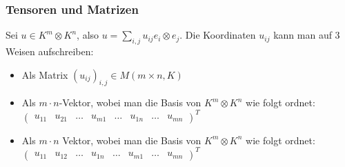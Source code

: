 \documentclass[9pt, a4paper, twocolumn, landscape]{article}
\newcommand{\comment}[1]{}
\begin{document}
\subsubsection{Tensoren und Matrizen}
\begin{remark}
Sei $u \in K^m \otimes K^n$, also $u = \sum\limits_{i, j} u_{ij} e_i \otimes e_j$.
Die Koordinaten $u_{ij}$ kann man auf 3 Weisen aufschreiben:
\begin{itemize}
\item Als Matrix $(u_{ij})_{i,j} \in M(m \times n, K)$
\item Als $m \cdot n$-Vektor, wobei man die Basis von $K^m \otimes K^n$ wie folgt ordnet:
$\left(\begin{array}{cccccccc}
u_{11} &
u_{21} &
\hdots &
u_{m1} &
\hdots &
u_{1n} &
\hdots &
u_{mn}
\end{array}\right)^T
$
\item Als $m \cdot  n$ Vektor, wobei man die Basis von $K^m \otimes K^n$ wie folgt ordnet: 
$\left(\begin{array}{cccccccc}
u_{11} &
u_{12} &
\hdots &
u_{1n} &
\hdots &
u_{m1} &
\hdots &
u_{mn}
\end{array}\right)^T
$
\comment{
\item Als $m \cdot n$-Vektor, wobei man die Basis von $K^m \otimes K^n$ wie folgt ordnet:
$\left(\begin{array}{c}
u_{11} \\
u_{21} \\
\vdots \\
u_{m1} \\
\vdots \\
u_{1n} \\
\vdots \\
u_{mn}
\end{array}\right)
$
\item Als $m \cdot  n$ Vektor, wobei man die Basis von $K^m \otimes K^n$ wie folgt ordnet: 
$\left(\begin{array}{c}
u_{11} \\
u_{12} \\
\vdots \\
u_{1n} \\
\vdots \\
u_{m1} \\
\vdots \\
u_{mn}
\end{array}\right)
$}
\end{itemize}

\end{remark}
\end{document}
